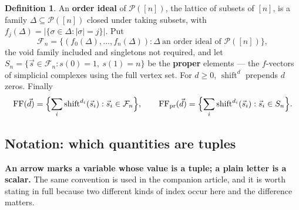 \documentclass[11pt, a4paper, abstract=yes]{scrartcl}
\theoremstyle{definition}
\newtheorem{definition}{Definition}
\theoremstyle{remark}
\theoremstyle{plain}
\newcommand{\shift}{\operatorname{shift}}
\begin{document}
\begin{definition}
An \textbf{order ideal} of \(\mathcal P([n])\), the lattice of subsets of \([n]\), is a family
\(\Delta\subseteq\mathcal P([n])\) closed under taking subsets, with
\(f_j(\Delta)=|\lbrace\sigma\in\Delta:|\sigma|=j\rbrace|\). Put
\begin{equation}\label{eq:auto-6}
  \mathcal F_n=\lbrace(f_0(\Delta),\dots,f_n(\Delta)):\Delta\ \text{an order ideal of }\mathcal P([n])\rbrace,
\end{equation}
the void family included and singletons not required, and let
\(S_n=\lbrace \vec s\in\mathcal F_n:s(0)=1,\ s(1)=n\rbrace\) be the \textbf{proper} elements --- the \(f\)-vectors
of simplicial complexes using the full vertex set. For \(d\ge0\), \(\shift^d\) prepends \(d\) zeros.
Finally
\begin{equation}\label{eq:auto-7}
  \mathrm{FF}(\vec d)=\Bigl\lbrace\sum_i\shift^{d_i}(\vec s_i):\vec s_i\in\mathcal F_n\Bigr\rbrace,\qquad
  \mathrm{FF}_{\mathrm{pr}}(\vec d)=\Bigl\lbrace\sum_i\shift^{d_i}(\vec s_i):\vec s_i\in S_n\Bigr\rbrace .
\end{equation}
\label{def-fn}
\end{definition}
\subsection{Notation: which quantities are tuples}
\label{sec:orgd2532ee}

\textbf{An arrow marks a variable whose value is a tuple; a plain letter is a scalar.} The same convention
is used in the companion article, and it is worth stating in full because two different kinds of
index occur here and the difference matters.
\end{document}
